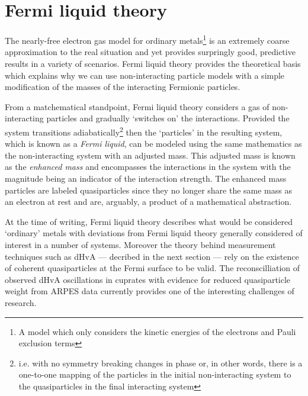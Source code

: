 

\section{Fermi liquid theory}

The nearly-free electron gas model for ordinary metals\footnote{A model which only considers the kinetic energies of the electrons and Pauli exclusion terms} is an extremely coarse approximation to the real situation and yet provides surpringly good, predictive results in a variety of scenarios. Fermi liquid theory provides the theoretical basis which explains why we can use non-interacting particle models with a simple modification of the masses of the interacting Fermionic particles.

From a matchematical standpoint, Fermi liquid theory considers a gas of non-interacting particles and gradually `switches on' the interactions. Provided the system transitions adiabatically\footnote{i.e. with no symmetry breaking changes in phase or, in other words, there is a one-to-one mapping of the particles in the initial non-interacting system to the quasiparticles in the final interacting system} then the `particles' in the resulting system, which is known as a \emph{Fermi liquid}, can be modeled using the same mathematics as the non-interacting system with an adjusted mass. This adjusted mass is known as the \emph{enhanced mass} and encompasses the interactions in the system with the magnitude being an indicator of the interaction strength. The enhanced mass particles are labeled quasiparticles since they no longer share the same mass as an electron at rest and are, arguably, a product of a mathematical abstraction.

At the time of writing, Fermi liquid theory describes what would be considered `ordinary' metals with deviations from Fermi liquid theory generally considered of interest in a number of systems. Moreover the theory behind measurement techniques such as \ac{dHvA} --- decribed in the next section --- rely on the existence of coherent quasiparticles at the Fermi surface to be valid. The reconscilliation of observed \ac{dHvA} oscillations in cuprates with evidence for reduced quasiparticle weight from \ac{ARPES} data currently provides one of the interesting challenges of \highTc research.

